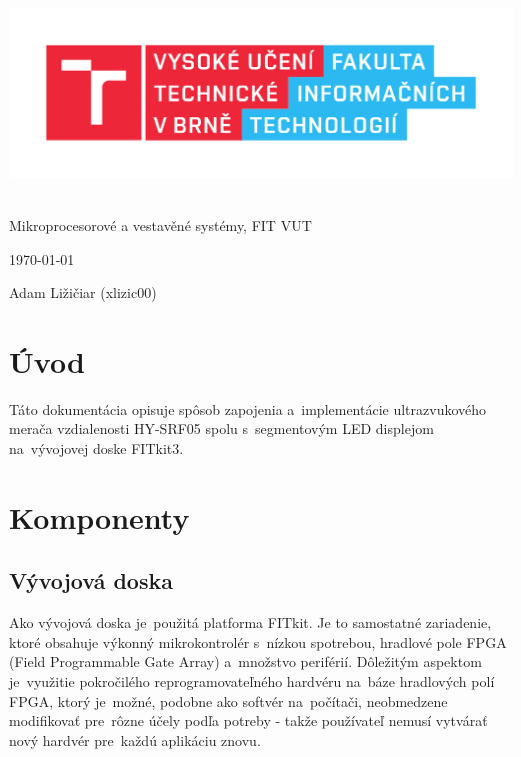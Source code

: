 \documentclass[a4paper, 11pt]{article}
\begin{document}
	\begin{titlepage}
		\begin{center}
			\includegraphics[width=0.77\linewidth]{resources/logo_FIT.pdf} \\


			 \\
			\LARGE{Mikroprocesorové a vestavěné systémy, FIT VUT} \\
		\end{center}

		\begin{minipage}[b]{0.4 \textwidth}
			\raggedright
			{\Large \today}
		\end{minipage}
		\hfill
		\begin{minipage}[b]{0.6 \textwidth}
			\raggedleft
			\Large
			Adam Ližičiar (xlizic00)\\
		\end{minipage}		
	\end{titlepage}

	\setcounter{page}{1}
	\tableofcontents
	\clearpage

	\setcounter{page}{1}
	
	\section{Úvod}
	Táto dokumentácia opisuje spôsob zapojenia a~implementácie ultrazvukového merača vzdialenosti HY-SRF05 spolu s~segmentovým LED displejom na~vývojovej doske FITkit3.

	\section{Komponenty}
    
	\subsection{Vývojová doska}
    Ako vývojová doska je~použitá platforma FITkit. Je to samostatné zariadenie, ktoré obsahuje výkonný mikrokontrolér s~nízkou spotrebou, hradlové pole FPGA
    (Field Programmable Gate Array) a~množstvo periférií. Dôležitým aspektom je~využitie pokročilého reprogramovateľného hardvéru na~báze hradlových polí FPGA,
    ktorý je~možné, podobne ako softvér na~počítači, neobmedzene modifikovať pre~rôzne účely podľa potreby - takže používateľ nemusí vytvárať nový hardvér
    pre~každú aplikáciu znovu.\cite{FITkit}\newline
    
\end{document}
